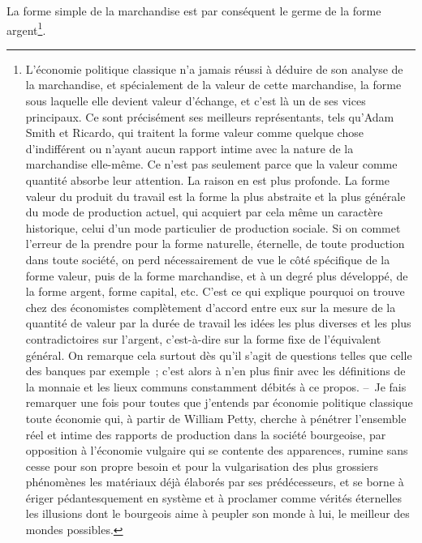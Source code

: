 \documentclass[french,twoside]{book} %
\begin{document}
La forme simple de la marchandise est par conséquent le germe de la forme argent\footnote{L’économie politique classique n’a jamais réussi à déduire de son analyse de la marchandise, et spécialement de la valeur de cette marchandise, la forme sous laquelle elle devient valeur d’échange, et c’est là un de ses vices principaux. Ce sont précisément ses meilleurs représentants, tels qu’Adam Smith et Ricardo, qui traitent la forme valeur comme quelque chose d’indifférent ou n’ayant aucun rapport intime avec la nature de la marchandise elle-même. Ce n’est pas seulement parce que la valeur comme quantité absorbe leur attention. La raison en est plus profonde. La forme valeur du produit du travail est la forme la plus abstraite et la plus générale du mode de production actuel, qui acquiert par cela même un caractère historique, celui d’un mode particulier de production sociale. Si on commet l’erreur de la prendre pour la forme naturelle, éternelle, de toute production dans toute société, on perd nécessairement de vue le côté spécifique de la forme valeur, puis de la forme marchandise, et à un degré plus développé, de la forme argent, forme capital, etc. C’est ce qui explique pourquoi on trouve chez des économistes complètement d’accord entre eux sur la mesure de la quantité de valeur par la durée de travail les idées les plus diverses et les plus contradictoires sur l’argent, c’est-à-dire sur la forme fixe de l’équivalent général. On remarque cela surtout dès qu’il s’agit de questions telles que celle des banques par exemple ; c’est alors à n’en plus finir avec les définitions de la monnaie et les lieux communs constamment débités à ce propos. – Je fais remarquer une fois pour toutes que j’entends par économie politique classique toute économie qui, à partir de William Petty, cherche à pénétrer l’ensemble réel et intime des rapports de production dans la société bourgeoise, par opposition à l’économie vulgaire qui se contente des apparences, rumine sans cesse pour son propre besoin et pour la vulgarisation des plus grossiers phénomènes les matériaux déjà élaborés par ses prédécesseurs, et se borne à ériger pédantesquement en système et à proclamer comme vérités éternelles les illusions dont le bourgeois aime à peupler son monde à lui, le meilleur des mondes possibles.}.
\end{document}
